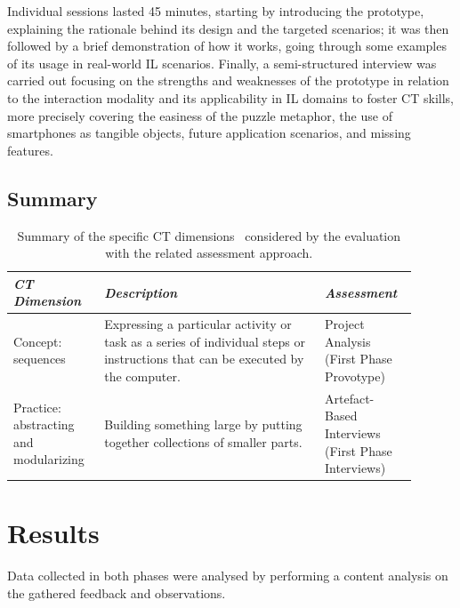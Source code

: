 Individual sessions lasted 45 minutes, starting by introducing the prototype, explaining the rationale behind its design and the targeted scenarios; it was then followed by a brief demonstration of how it works, going through some examples of its usage in real-world \ac{IL} scenarios. Finally, a semi-structured interview was carried out focusing on the strengths and weaknesses of the prototype in relation to the interaction modality and its applicability in \ac{IL} domains to foster \ac{CT} skills, more precisely covering the easiness of the puzzle metaphor, the use of smartphones as tangible objects, future application scenarios, and missing features.

\subsection{Summary}

\begin{table}[ht!]
  \caption{Summary of the specific \ac{CT} dimensions~\cite{Brennan:2012} considered by the evaluation with the related assessment approach.}\label{tab:ch4summary}
  \centering
  \begin{tabular}{M{0.2\linewidth}m{0.5\linewidth}M{0.2\linewidth}}
    \toprule
    \textit{\ac{CT} Dimension} & \textit{Description} & \textit{Assessment} \\
    \midrule
    Concept: sequences & Ex\-press\-ing a par\-tic\-u\-lar ac\-tiv\-i\-ty or task as a se\-ries of in\-di\-vid\-u\-al steps or in\-struc\-tions that can be ex\-e\-cut\-ed by the com\-put\-er. & Project Analysis (First Phase Provotype) \\
    Practice: abstracting and modularizing & Building something large by putting together collections of smaller parts. & Artefact-Based Interviews (First Phase Interviews) \\
    \bottomrule
  \end{tabular}
\end{table}


\section{Results}
Data collected in both phases were analysed by performing a content analysis on the gathered feedback and observations.

